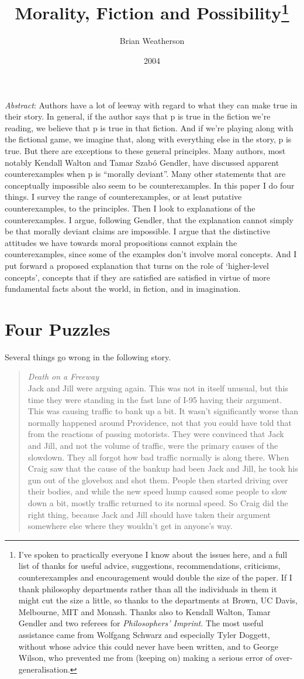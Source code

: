 \documentclass[
  11pt,
  letterpaper,
  DIV=11,
  numbers=noendperiod,
  twoside]{scrartcl}
\title{Morality, Fiction and Possibility\thanks{I've spoken to
practically everyone I know about the issues here, and a full list of
thanks for useful advice, suggestions, recommendations, criticisms,
counterexamples and encouragement would double the size of the paper. If
I thank philosophy departments rather than all the individuals in them
it might cut the size a little, so thanks to the departments at Brown,
UC Davis, Melbourne, MIT and Monash. Thanks also to Kendall Walton,
Tamar Gendler and two referees for \emph{Philosophers' Imprint}. The
most useful assistance came from Wolfgang Schwarz and especially Tyler
Doggett, without whose advice this could never have been written, and to
George Wilson, who prevented me from (keeping on) making a serious error
of over-generalisation.}}
\author{Brian Weatherson}
\date{2004}
\renewenvironment{abstract}
 {\vspace{-1.25cm}
 \quotation\small\noindent\emph{Abstract}:}
 {\endquotation}
\renewenvironment{abstract}
 {\quotation\small\noindent\emph{Abstract}:}
 {\endquotation\vspace{-0.02cm}}
\begin{document}
\maketitle
\begin{abstract}
Authors have a lot of leeway with regard to what they can make true in
their story. In general, if the author says that p is true in the
fiction we're reading, we believe that p is true in that fiction. And if
we're playing along with the fictional game, we imagine that, along with
everything else in the story, p is true. But there are exceptions to
these general principles. Many authors, most notably Kendall Walton and
Tamar Szabó Gendler, have discussed apparent counterexamples when p is
``morally deviant''. Many other statements that are conceptually
impossible also seem to be counterexamples. In this paper I do four
things. I survey the range of counterexamples, or at least putative
counterexamples, to the principles. Then I look to explanations of the
counterexamples. I argue, following Gendler, that the explanation cannot
simply be that morally deviant claims are impossible. I argue that the
distinctive attitudes we have towards moral propositions cannot explain
the counterexamples, since some of the examples don't involve moral
concepts. And I put forward a proposed explanation that turns on the
role of `higher-level concepts', concepts that if they are satisfied are
satisfied in virtue of more fundamental facts about the world, in
fiction, and in imagination.
\end{abstract}


\section{Four Puzzles}\label{four-puzzles}

Several things go wrong in the following story.

\begin{quote}
\emph{Death on a Freeway}\\
Jack and Jill were arguing again. This was not in itself unusual, but
this time they were standing in the fast lane of I-95 having their
argument. This was causing traffic to bank up a bit. It wasn't
significantly worse than normally happened around Providence, not that
you could have told that from the reactions of passing motorists. They
were convinced that Jack and Jill, and not the volume of traffic, were
the primary causes of the slowdown. They all forgot how bad traffic
normally is along there. When Craig saw that the cause of the bankup had
been Jack and Jill, he took his gun out of the glovebox and shot them.
People then started driving over their bodies, and while the new speed
hump caused some people to slow down a bit, mostly traffic returned to
its normal speed. So Craig did the right thing, because Jack and Jill
should have taken their argument somewhere else where they wouldn't get
in anyone's way.
\end{quote}
\end{document}
